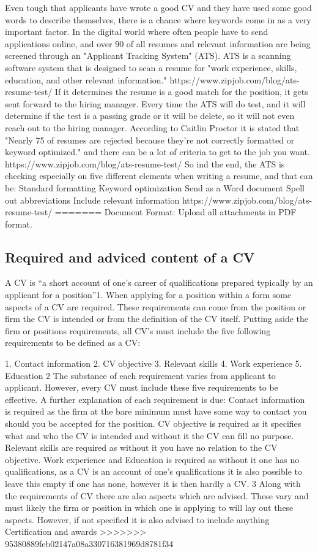 Even tough that applicants have wrote a good CV and they have used some good words to describe themselves, 
there is a chance where keywords come in as a very important factor. In the digital world where often people have to send applications online, and over 90 %
of all resumes and relevant information are being screened through an "Applicant Tracking System" (ATS). ATS is a scanning software system 
that is designed to scan a resume for "work experience, skills, education, and other relevant information." https://www.zipjob.com/blog/ats-resume-test/
If it determines the resume is a good match for the position, it gets sent forward to the hiring manager. 
Every time the ATS will do test, and it will determine if the test is a passing grade or it will be delete, so it will not even reach out to the hiring manager. 
According to Caitlin Proctor it is stated that "Nearly 75 %
of resumes are rejected because they’re not correctly formatted or keyword optimized." and there can be a lot of criteria 
to get to the job you want. https://www.zipjob.com/blog/ats-resume-test/
So ind the end, the ATS is checking especially on five different elements when writing a resume, and that can be:
Standard formatting
Keyword optimization
Send as a Word document
Spell out abbreviations
Include relevant information
https://www.zipjob.com/blog/ats-resume-test/
=======
Document Format: Upload all attachments in PDF format.

\subsection{Required and adviced content of a CV}
A CV  is “a short account of one’s career of qualifications prepared typically by an applicant for a position”1. When applying for a position within a form some aspects of a CV are required. These requirements can come from the position or firm the CV is intended or from the definition of the CV itself.
Putting aside the firm or positions requirements, all CV’s must include the five following requirements to be defined as a CV:

1. Contact information
2. CV objective
3. Relevant skills
4. Work experience
5. Education
2
The substance of each requirement varies from applicant to applicant. However, every CV must include these five requirements to be effective. A further explanation of each requirement is due:
Contact information is required as the firm at the bare minimum must have some way to contact you should you be accepted for the position. CV objective is required as it specifies what and who the CV is intended and without it the CV can fill no purpose. Relevant skills are required as without it you have no relation to the CV objective. Work experience and Education is required as without it one has no qualifications, as a CV is an account of one’s qualifications it is also possible to leave this empty if one has none, however it is then hardly a CV.  3
Along with the requirements of CV there are also aspects which are advised. These vary and must likely the firm or position in which one is applying to will lay out these aspects. However, if not specified it is also advised to include anything Certification and awards
>>>>>>> 95380889feb02147a08a330716381969d8781f34
